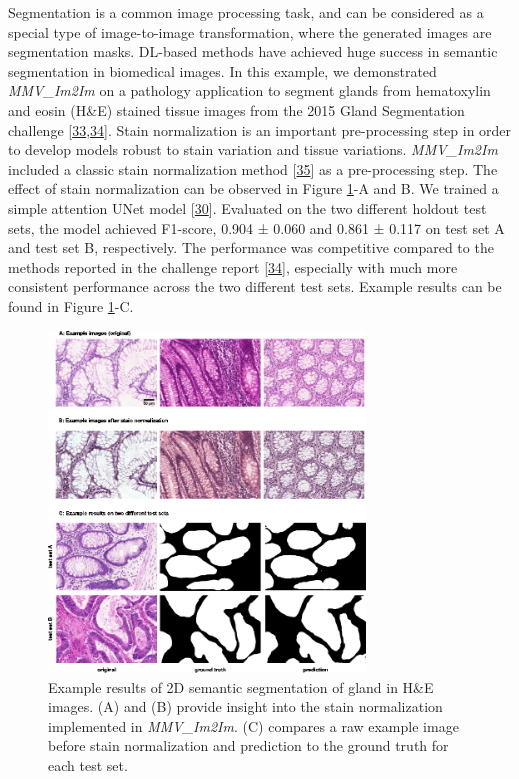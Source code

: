 Segmentation is a common image processing task, and can be considered as a special type of image-to-image transformation, where the generated images are segmentation masks. DL-based methods have achieved huge success in semantic segmentation in biomedical images. In this example, we demonstrated \emph{MMV\_Im2Im} on a pathology application to segment glands from hematoxylin and eosin (H\&E) stained tissue images from the 2015 Gland Segmentation challenge {[}\protect\hyperlink{ref-45Sirz1X}{33},\protect\hyperlink{ref-XAffSYIR}{34}{]}. Stain normalization is an important pre-processing step in order to develop models robust to stain variation and tissue variations. \emph{MMV\_Im2Im} included a classic stain normalization method {[}\protect\hyperlink{ref-tQhnZyjK}{35}{]} as a pre-processing step. The effect of stain normalization can be observed in Figure \ref{fig:2d_gland}-A and B. We trained a simple attention UNet model {[}\protect\hyperlink{ref-OCow1hly}{30}{]}. Evaluated on the two different holdout test sets, the model achieved F1-score, 0.904 ± 0.060 and 0.861 ± 0.117 on test set A and test set B, respectively. The performance was competitive compared to the methods reported in the challenge report {[}\protect\hyperlink{ref-XAffSYIR}{34}{]}, especially with much more consistent performance across the two different test sets. Example results can be found in Figure \ref{fig:2d_gland}-C.

\begin{figure}
\hypertarget{fig:2d_gland}{%
\centering
\includegraphics[width=0.75\textwidth,height=\textheight]{images/2d_semantic_seg_justin.png}
\caption{Example results of 2D semantic segmentation of gland in H\&E images. (A) and (B) provide insight into the stain normalization implemented in \emph{MMV\_Im2Im}. (C) compares a raw example image before stain normalization and prediction to the ground truth for each test set.}\label{fig:2d_gland}
}
\end{figure}

